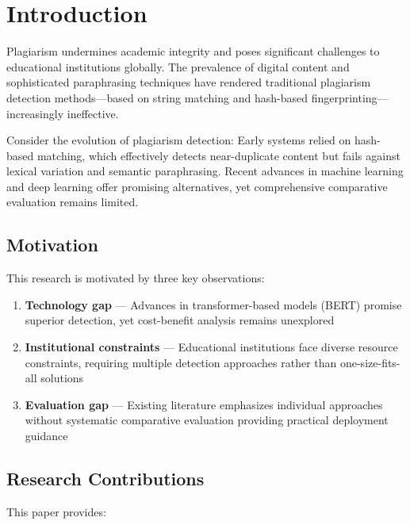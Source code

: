 \section{Introduction}

Plagiarism undermines academic integrity and poses significant challenges to educational institutions globally. The prevalence of digital content and sophisticated paraphrasing techniques have rendered traditional plagiarism detection methods—based on string matching and hash-based fingerprinting—increasingly ineffective.

Consider the evolution of plagiarism detection: Early systems relied on hash-based matching, which effectively detects near-duplicate content but fails against lexical variation and semantic paraphrasing. Recent advances in machine learning and deep learning offer promising alternatives, yet comprehensive comparative evaluation remains limited.

\subsection{Motivation}

This research is motivated by three key observations:

\begin{enumerate}
  \item \textbf{Technology gap} --- Advances in transformer-based models (BERT) promise superior detection, yet cost-benefit analysis remains unexplored
  
  \item \textbf{Institutional constraints} --- Educational institutions face diverse resource constraints, requiring multiple detection approaches rather than one-size-fits-all solutions
  
  \item \textbf{Evaluation gap} --- Existing literature emphasizes individual approaches without systematic comparative evaluation providing practical deployment guidance
\end{enumerate}

\subsection{Research Contributions}

This paper provides:

